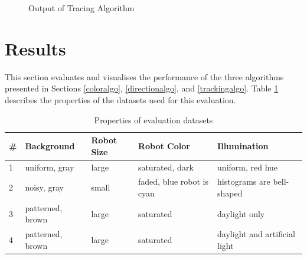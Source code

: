 \documentclass[10pt,a4paper]{article}
\begin{document}
\begin{figure}[ht]
    \begin{center}
    \end{center}
    \caption{Output of Tracing Algorithm}
    \label{trackingfig}
\end{figure}


\section{Results}\label{results}
This section evaluates and visualises the performance of the three algorithms 
presented in Sections \ref{coloralgo}, \ref{directionalgo}, and 
\ref{trackingalgo}. Table \ref{datasetpropstable} describes the properties of 
the datasets used for this evaluation.
\begin{table}[ht]
\begin{tabular}{|l || l | l | p{2cm} | p{4cm}|}
\hline
\# & Background & Robot Size & Robot Color & Illumination \\
\hline
1 & uniform, gray & large & saturated, dark & uniform, red hue \\
\hline
2 & noisy, gray & small & faded, blue robot is cyan & 
    histograms are bell-shaped \\
\hline
3 & patterned, brown & large & saturated & daylight only \\
\hline
4 & patterned, brown & large & saturated & daylight and artificial 
    light \\
\hline
\end{tabular}
\caption{Properties of evaluation datasets}
\label{datasetpropstable}
\end{table}
\end{document}
